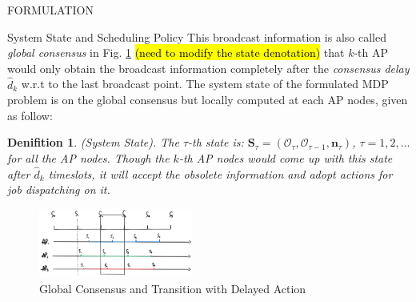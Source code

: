 \documentclass[10pt, conference, letterpaper]{IEEEtran}
\newtheorem{definition}{Denifition}
\renewcommand{\vec}{\mathbf}
\newcommand{\Stat}{\mathbf{S}}
\newcommand{\Obsv}{\mathcal{O}}
\begin{document}
\begin{section}{FORMULATION}
\begin{subsection}{System State and Scheduling Policy}
            This broadcast information is also called \emph{global consensus} in Fig. \ref{fig:br-trans} \hl{(need to modify the state denotation)} that $k$-th AP would only obtain the broadcast information completely after the \emph{consensus delay} $\hat{d}_{k}$ w.r.t to the last broadcast point. The system state of the formulated MDP problem is on the global consensus but locally computed at each AP nodes, given as follow:
            \begin{definition}(System State).
                The $\tau$-th state is: $\Stat_\tau = (\Obsv_{\tau}, \Obsv_{\tau-1}, \vec{n}_\tau)$, $\tau=1,2,\dots$ for all the AP nodes. Though the $k$-th AP nodes would come up with this state after $\hat{d}_k$ timeslots, it will accept the obsolete information and adopt actions for job dispatching on it.
            \end{definition}
            \begin{figure}[ht]
                \centering
                \includegraphics[width=0.45\textwidth]{broadcast-trans.png}
                \caption{Global Consensus and Transition with Delayed Action}
                \label{fig:br-trans}
            \end{figure}


\end{subsection}
\end{section}
\end{document}
